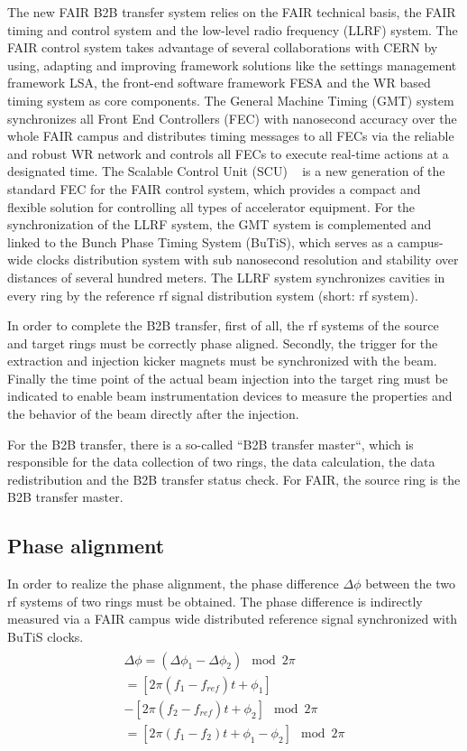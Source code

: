 The new FAIR B2B transfer system relies on the FAIR technical basis, the FAIR timing and control system and the low-level radio frequency (LLRF) system. The FAIR control system takes advantage of several collaborations with CERN by using, adapting and improving framework solutions like the settings management framework LSA, the front-end software framework FESA and the WR based timing system as core components. The General Machine Timing (GMT) system synchronizes all Front End Controllers (FEC) with nanosecond accuracy over the whole FAIR campus and distributes timing messages to all FECs via the reliable and robust WR network and controls all FECs to execute real-time actions at a designated time. The Scalable Control Unit (SCU) ~\cite{kaiser_f-tn-c-008e_2014} is a new generation of the standard FEC for the FAIR control system, which provides a compact and flexible solution for controlling all types of accelerator equipment. For the synchronization of the LLRF system, the GMT system is complemented and linked to the Bunch Phase Timing System (BuTiS), which serves as a campus-wide clocks distribution system with sub nanosecond resolution and stability over distances of several hundred meters. The LLRF system synchronizes cavities in every ring by the reference rf signal distribution system (short: rf system). 

In order to complete the B2B transfer, first of all, the rf systems of the source and target rings must be correctly phase aligned. Secondly, the trigger for the extraction and injection kicker magnets must be synchronized with the beam. Finally the time point of the actual beam injection into the target ring must be indicated to enable beam instrumentation devices to measure the properties and the behavior of the beam directly after the injection. 

For the B2B transfer, there is a so-called “B2B transfer master“, which is responsible for the data collection of two rings, the data calculation, the data redistribution and the B2B transfer status check. For FAIR, the source ring is the B2B transfer master.

\subsection{Phase alignment}
In order to realize the phase alignment, the phase difference $\Delta \phi$ between the two rf systems of two rings must be obtained. The phase difference is indirectly measured via a FAIR campus wide distributed reference signal synchronized with BuTiS clocks. 
\begin{eqnarray}
\begin{aligned}
	\Delta \phi=(\Delta \phi_1-\Delta \phi_2) \mod 2\pi\\
=[2\pi(f_1-f_\mathit{ref})t+\phi_1]\\
-[2\pi(f_2-f_\mathit{ref})t+\phi_2] \mod 2\pi \\
=[2\pi(f_1-f_2)t+\phi_1-\phi_2] \mod 2\pi
\end{aligned}
\end{eqnarray}


